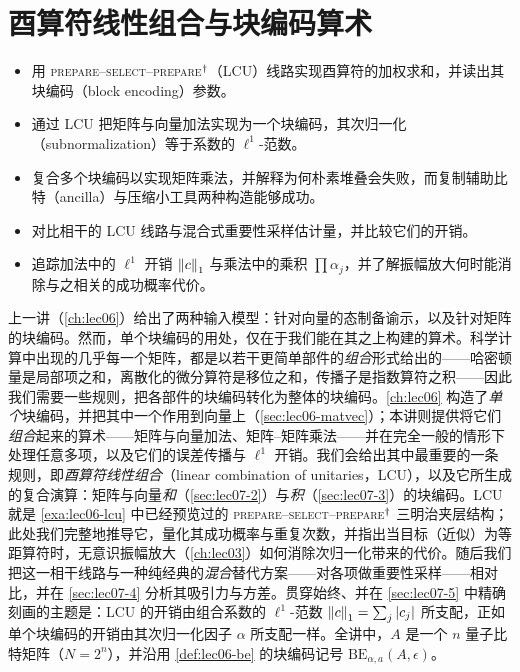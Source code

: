 \chapter{酉算符线性组合与块编码算术}
\label{ch:lec07}

\begin{objectives}
\begin{itemize}[leftmargin=1.4em,nosep]
  \item 用 \textsc{prepare}--\textsc{select}--\textsc{prepare}$^{\dagger}$（LCU）线路实现酉算符的加权求和，并读出其块编码（block encoding）参数。
  \item 通过 LCU 把矩阵与向量加法实现为一个块编码，其次归一化（subnormalization）等于系数的 $\ell^1$-范数。
  \item 复合多个块编码以实现矩阵乘法，并解释为何朴素堆叠会失败，而复制辅助比特（ancilla）与压缩小工具两种构造能够成功。
  \item 对比相干的 LCU 线路与混合式重要性采样估计量，并比较它们的开销。
  \item 追踪加法中的 $\ell^1$ 开销 $\left\lVert c \right\rVert_1$ 与乘法中的乘积 $\prod\alpha_j$，并了解振幅放大何时能消除与之相关的成功概率代价。
\end{itemize}
\end{objectives}

上一讲（\cref{ch:lec06}）给出了两种输入模型：针对向量的态制备谕示，以及针对矩阵的块编码。然而，单个块编码的用处，仅在于我们能在其之上构建的算术。科学计算中出现的几乎每一个矩阵，都是以若干更简单部件的\emph{组合}形式给出的——哈密顿量是局部项之和，离散化的微分算符是移位之和，传播子是指数算符之积——因此我们需要一些规则，把各部件的块编码转化为整体的块编码。\cref{ch:lec06} 构造了\emph{单个}块编码，并把其中一个作用到向量上（\cref{sec:lec06-matvec}）；本讲则提供将它们\emph{组合}起来的算术——矩阵与向量加法、矩阵--矩阵乘法——并在完全一般的情形下处理任意多项，以及它们的误差传播与 $\ell^1$ 开销。我们会给出其中最重要的一条规则，即\emph{酉算符线性组合}（linear combination of unitaries，LCU），以及它所生成的复合演算：矩阵与向量\emph{和}（\cref{sec:lec07-2}）与\emph{积}（\cref{sec:lec07-3}）的块编码。LCU 就是 \cref{exa:lec06-lcu} 中已经预览过的
\textsc{prepare}--\textsc{select}--\textsc{prepare}$^{\dagger}$ 三明治夹层结构；此处我们完整地推导它，量化其成功概率与重复次数，并指出当目标（近似）为等距算符时，无意识振幅放大（\cref{ch:lec03}）如何消除次归一化带来的代价。随后我们把这一相干线路与一种纯经典的\emph{混合}替代方案——对各项做重要性采样——相对比，并在 \cref{sec:lec07-4} 分析其吸引力与方差。贯穿始终、并在 \cref{sec:lec07-5} 中精确刻画的主题是：LCU 的开销由组合系数的 $\ell^1$-范数 $\left\lVert c \right\rVert_1=\sum_j\left\lvert c_j \right\rvert$ 所支配，正如单个块编码的开销由其次归一化因子 $\alpha$ 所支配一样。全讲中，$A$ 是一个 $n$ 量子比特矩阵（$N=2^n$），并沿用 \cref{def:lec06-be} 的块编码记号 $\mathrm{BE}_{\alpha,a}(A,\epsilon)$。

